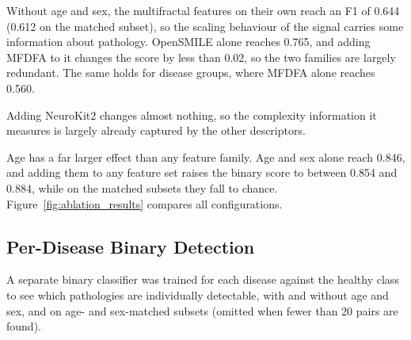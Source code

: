 \documentclass[runningheads]{llncs}
\begin{document}
Without age and sex, the multifractal features on their own reach an F1 of 0.644 (0.612 on the matched subset), so the scaling behaviour of the signal carries some information about pathology. OpenSMILE alone reaches 0.765, and adding MFDFA to it changes the score by less than 0.02, so the two families are largely redundant. The same holds for disease groups, where MFDFA alone reaches 0.560.

Adding NeuroKit2 changes almost nothing, so the complexity information it measures is largely already captured by the other descriptors.

Age has a far larger effect than any feature family. Age and sex alone reach 0.846, and adding them to any feature set raises the binary score to between 0.854 and 0.884, while on the matched subsets they fall to chance. Figure~\ref{fig:ablation_results} compares all configurations.

  \subsection{Per-Disease Binary Detection}

  A separate binary classifier was trained for each disease against the healthy class to see which pathologies are individually detectable, with and without age and sex, and on age- and sex-matched subsets (omitted when fewer than 20 pairs are found).
\end{document}
